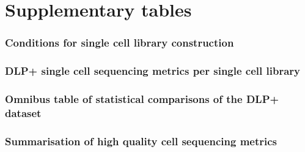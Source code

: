 \documentclass{article}
\begin{document}
\section{Supplementary tables}
\subsubsection{Conditions for single cell library construction}

\subsubsection{DLP+ single cell sequencing metrics per single cell library}
\begin{comment}
\end{comment}

\subsubsection{Omnibus table of statistical comparisons of the DLP+ dataset}

\subsubsection{Summarisation of high quality cell sequencing metrics}

\begin{comment}
passed/failed is simply if quality >= 0.75 or not, the number of cells that fall into these categories (edited) 
cells is total number of cells in the library
success_rate == passed / total cells
live_cells is cells with cell_state == C1
dead_cells is cells with cell_state == C2
\end{comment}
\end{document}

